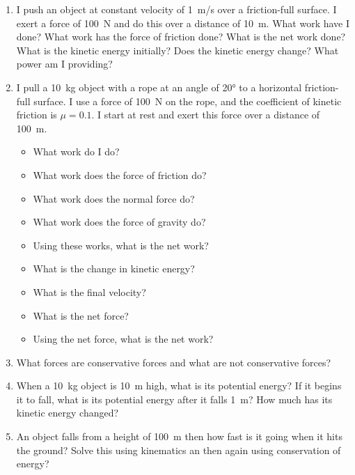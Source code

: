 \begin{enumerate}
\item I push an object at constant velocity of \SI{1}{m/s} over a friction-full surface. I exert a force of \SI{100}{\newton} and do this over a distance of \SI{10}{\meter}. What work have I done? What work has the force of friction done? What is the net work done? What is the kinetic energy initially? Does the kinetic energy change? What power am I providing?
\bigskip

\item 
I pull a \SI{10}{kg} object with a rope at an angle of \ang{20} to a horizontal friction-full surface. I use a force of \SI{100}{\newton} on the rope, and the coefficient of kinetic friction is $\mu=0.1$. I start at rest and exert this force over a distance of \SI{100}{\meter}. 
\begin{itemize}
	\setlength\itemsep{1 in}
	\item What work do I do?
	\item What work does the force of friction do?
	\item What work does the normal force do?
	\item What work does the force of gravity do?
	\item Using these works, what is the net work?
	\item What is the change in kinetic energy?
	\item What is the final velocity?
	\item What is the net force?
	\item Using the net force, what is the net work?
\end{itemize}

\item What forces are conservative forces and what are not conservative forces?

\item 
When a \SI{10}{kg} object is \SI{10}{\meter} high, what is its potential energy? If it begins it to fall, what is its potential energy after it falls \SI{1}{\meter}? How much has its kinetic energy changed?

\item 
An object falls from a height of \SI{100}{\meter} then how fast is it going when it hits the ground? Solve this using kinematics an then again using conservation of energy? \bigskip


\end{enumerate}
